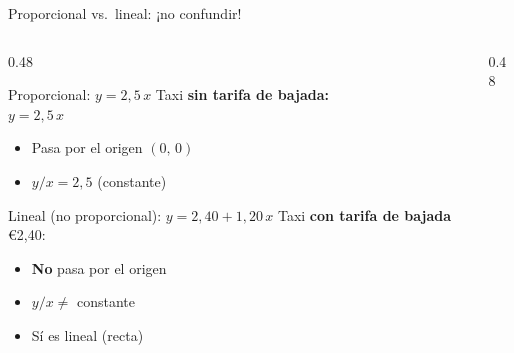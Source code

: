 \documentclass[aspectratio=169, 10pt, spanish]{beamer}
\begin{document}
\begin{frame}{Proporcional vs.\ lineal: ¡no confundir!}
  \begin{columns}[c]
    \begin{column}{0.48\textwidth}
      \begin{block}{\normalsize\correcto Proporcional: $y = 2{,}5\,x$}
        Taxi \textbf{sin tarifa de bajada:}\\
        $y = 2{,}5\,x$
        \begin{itemize}
          \item Pasa por el origen $(0,\,0)$
          \item $y/x = 2{,}5$ (constante)
        \end{itemize}
      \end{block}
      
            \begin{alertblock}{\normalsize\incorrecto Lineal (no proporcional): $y = 2{,}40 + 1{,}20\,x$}
              Taxi \textbf{con tarifa de bajada} €2{,}40:
              \begin{itemize}
                \item \textbf{No} pasa por el origen
                \item $y/x \neq$ constante
                \item Sí es lineal (recta)
              \end{itemize}
            \end{alertblock}
    \end{column}
    \begin{column}{0.48\textwidth}

  \begin{center}
  \end{center}
  
      \end{column}
    \end{columns}
\end{frame}
\end{document}
